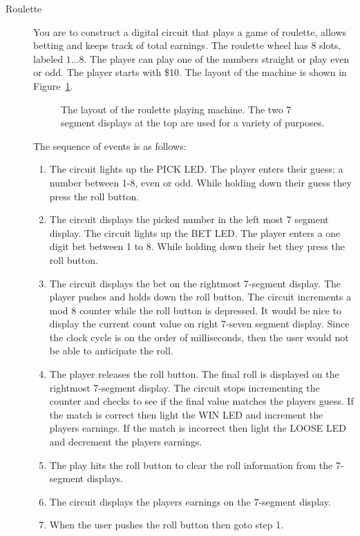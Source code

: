 \begin{description}
\item[Roulette]

You are to construct a digital circuit that plays a game of
roulette, allows betting and keeps track of total earnings.
The roulette wheel has 8 slots, labeled $1 \ldots 8$.  The player
can play one of the numbers straight or play even or odd.
The player starts with \$10. 
The layout of the machine is shown in Figure~\ref{fig:Roulette}.
\begin{figure}[ht]
\caption{The layout of the roulette playing machine.  
The two 7 segment displays at the top are used for a variety
of purposes.}
\label{fig:Roulette}
\end{figure}

The sequence of events is as follows:
\begin{enumerate}
\item	The circuit lights up the PICK LED.
	The player enters their guess; a number between 1-8, even or odd.
	While holding down their guess they press the roll button.
\item	The circuit displays the picked number in the left most
	7 segment display.  The circuit lights up the BET LED.
	The player enters a one digit bet between 1 to 8.  While holding
	down their bet they press the roll button.
\item 	The circuit displays the bet on the rightmost 7-segment
	display.
	The player pushes and holds down the roll button.
	The circuit increments a mod 8 counter while the roll 
	button is depressed. It would be nice to display the
	current count value on right 7-seven segment display.
	Since the clock cycle is on the order of milliseconds,
	then the user would not be able to anticipate the roll.
\item	The player releases the roll button.  The final roll
	is displayed on the rightmost 7-segment display.
	The circuit stops incrementing the counter and checks
	to see if the final value matches the players guess.
	If the match is correct then light the WIN LED and
	increment the players earnings.  If the match is incorrect
	then light the LOOSE LED and decrement the players
	earnings.
\item	The play hits the roll button to clear the roll information
	from the 7-segment displays.
\item	The circuit displays the players earnings on the 7-segment
	display.
\item	When the user pushes the roll button then goto step 1.
\end{enumerate}


\end{description}
